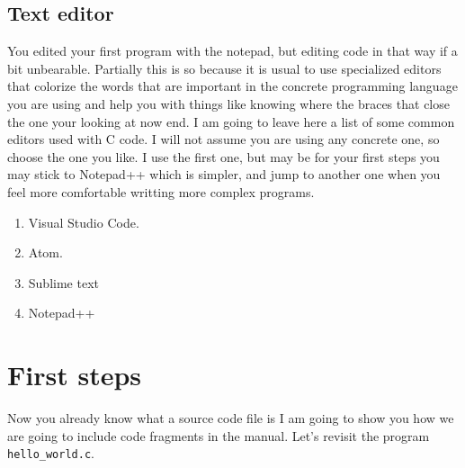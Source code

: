 \documentclass[a4paper]{article}
\begin{document}
\subsection{Text editor}

You edited your first program with the notepad, but editing code in that way
if a bit unbearable. Partially this is so because it is usual to use specialized
editors that colorize the words that are important in the concrete programming
language you are using and help you with things like knowing where the braces
that close the one your looking at now end. I am going to leave here a list of
some common editors used with C code. I will not assume you are using any
concrete one, so choose the one you like. I use the first one, but may be for
your first steps you may stick to Notepad++ which is simpler, and jump
to another one when you feel more comfortable writting more complex programs.
\begin{enumerate}
    \item Visual Studio Code.
    \item Atom.
    \item Sublime text
    \item Notepad++
\end{enumerate}

\section{First steps}

Now you already know what a source code file is I am going to show you how we
are going to include code fragments in the manual. Let's revisit the program
\verb!hello_world.c!.
\end{document}
